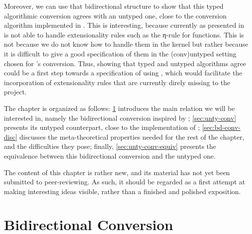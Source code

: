 Moreover, we can use that bidirectional structure
to show that this typed algorithmic conversion agrees with an untyped one,
close to the conversion algorithm implemented in .
This is interesting, because currently  as presented in 
is not able to handle extensionality rules such as the η-rule for functions.
This is not because we do not know how to handle them in the kernel%
but rather because it is difficult to give a good specification of them in the
\kl(conv){untyped} setting chosen for ’s conversion.%
%
Thus, showing that typed and untyped algorithms agree could be a first step towards a specification of
 using , which would facilitate the incorporation of
extensionality rules that are currently direly missing to the project.

The chapter is organized as follows: \cref{sec:bidir-conv} introduces the main relation we will
be interested in, namely the bidirectional conversion inspired by \textcite{Abel2017};
\cref{sec:unty-conv} presents its untyped counterpart, close to the implementation of ;
\cref{sec:bd-conv-disc} discusses the meta-theoretical properties needed for the rest of
the chapter, and the difficulties they pose;
finally, \cref{sec:unty-conv-equiv} presents the equivalence
between this bidirectional conversion and the untyped one.

The content of this chapter is rather new, and its material has not yet been submitted to peer-reviewing.
As such, it should be regarded as a first attempt at making interesting ideas visible,
rather than a finished and polished exposition.

\section{Bidirectional Conversion}
\label{sec:bidir-conv}

